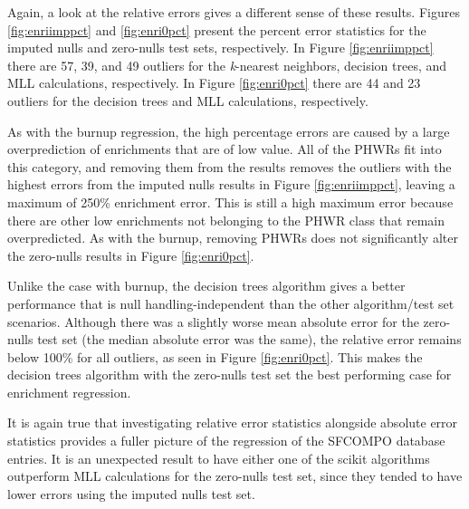 Again, a look at the relative errors gives a different sense of these results.
Figures \ref{fig:enriimppct} and \ref{fig:enri0pct} present the percent error
statistics for the imputed nulls and zero-nulls test sets, respectively.  In
Figure \ref{fig:enriimppct} there are 57, 39, and 49 outliers for the
\textit{k}-nearest neighbors, decision trees, and \gls{MLL} calculations,
respectively.  In Figure \ref{fig:enri0pct} there are 44 and 23 outliers for
the decision trees and \gls{MLL} calculations, respectively.

As with the burnup regression, the high percentage errors are caused by a large
overprediction of enrichments that are of low value. All of the \gls{PHWR}s fit
into this category, and removing them from the results removes the outliers
with the highest errors from the imputed nulls results in Figure
\ref{fig:enriimppct}, leaving a maximum of 250\% enrichment error. This is
still a high maximum error because there are other low enrichments not
belonging to the \gls{PHWR} class that remain overpredicted.  As with the
burnup, removing \gls{PHWR}s does not significantly alter the zero-nulls
results in Figure \ref{fig:enri0pct}.

Unlike the case with burnup, the decision trees algorithm gives a better
performance that is null handling-independent than the other algorithm/test set
scenarios. Although there was a slightly worse mean absolute error for the
zero-nulls test set (the median absolute error was the same), the relative
error remains below 100\% for all outliers, as seen in Figure
\ref{fig:enri0pct}.  This makes the decision trees algorithm with the
zero-nulls test set the best performing case for enrichment regression.

It is again true that investigating relative error statistics alongside
absolute error statistics provides a fuller picture of the regression of the
\gls{SFCOMPO} database entries.  It is an unexpected result to have either one
of the scikit algorithms outperform \gls{MLL} calculations for the zero-nulls
test set, since they tended to have lower errors using the imputed nulls test
set. 
